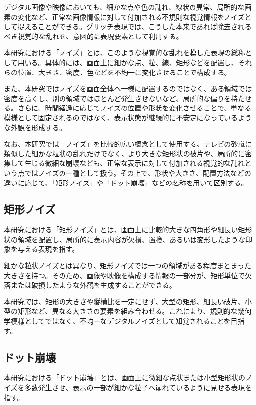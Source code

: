 デジタル画像や映像においても、細かな点や色の乱れ、線状の異常、局所的な画素の変化など、正常な画像情報に対して付加される不規則な視覚情報をノイズとして捉えることができる。グリッチ表現では、こうした本来であれば除去されるべき視覚的な乱れを、意図的に表現要素として利用する。

本研究における「ノイズ」とは、このような視覚的な乱れを模した表現の総称として用いる。具体的には、画面上に細かな点、粒、線、矩形などを配置し、それらの位置、大きさ、密度、色などを不均一に変化させることで構成する。

また、本研究ではノイズを画面全体へ一様に配置するのではなく、ある領域では密度を高くし、別の領域ではほとんど発生させないなど、局所的な偏りを持たせる。さらに、時間経過に応じてノイズの位置や形状を変化させることで、単なる模様として固定されるのではなく、表示状態が継続的に不安定になっているような外観を形成する。

なお、本研究では「ノイズ」を比較的広い概念として使用する。テレビの砂嵐に類似した細かな粒状の乱れだけでなく、より大きな矩形状の破片や、局所的に密集して生じる微細な崩壊なども、正常な表示に対して付加される視覚的な乱れという点ではノイズの一種として扱う。その上で、形状や大きさ、配置方法などの違いに応じて、「矩形ノイズ」や「ドット崩壊」などの名称を用いて区別する。


\subsection{矩形ノイズ}

本研究における「矩形ノイズ」とは、画面上に比較的大きな四角形や細長い矩形状の領域を配置し、局所的に表示内容が欠損、置換、あるいは変形したような印象を与える表現を指す。

細かな粒状ノイズとは異なり、矩形ノイズでは一つの領域がある程度まとまった大きさを持つ。そのため、画像や映像を構成する情報の一部分が、矩形単位で欠落または破損したような外観を生成することができる。

本研究では、矩形の大きさや縦横比を一定にせず、大型の矩形、細長い破片、小型の矩形など、異なる大きさの要素を組み合わせる。これにより、規則的な幾何学模様としてではなく、不均一なデジタルノイズとして知覚されることを目指す。


\subsection{ドット崩壊}

本研究における「ドット崩壊」とは、画面上に微細な点状または小型矩形状のノイズを多数発生させ、表示の一部が細かな粒子へ崩れているように見せる表現を指す。

